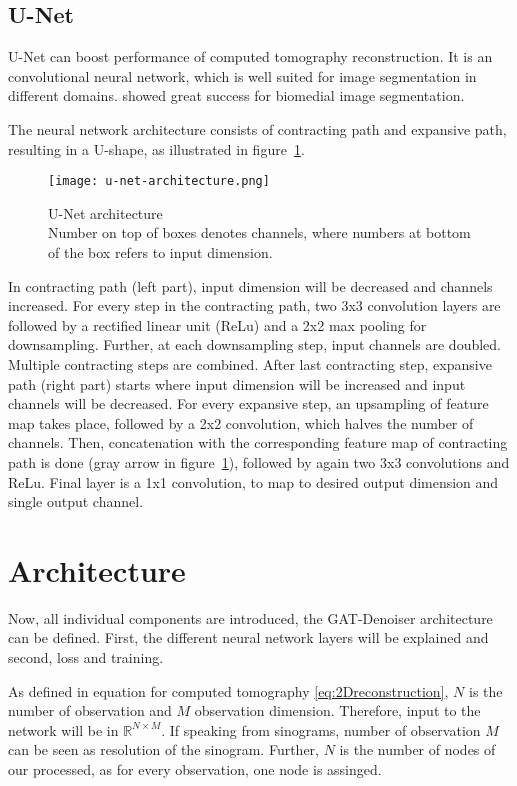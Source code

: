 \subsection{U-Net}
U-Net can boost performance of computed tomography reconstruction.
It is an convolutional neural network, which is well suited for image segmentation in different domains.
\cite{unet-tomography} showed great success for biomedial image segmentation.

The neural network architecture consists of contracting path and expansive path,
resulting in a U-shape, as illustrated in figure~\ref{fig:u-net-architectue}.

\begin{figure}[H]
  \centering
  \label{fig:u-net-architectue}
  \texttt{[image: u-net-architecture.png]}
  \caption{
    U-Net architecture \cite[p 2, Fig. 1]{unet-tomography} \\
    Number on top of boxes denotes channels, where numbers at bottom of the box refers to input dimension.
    }
\end{figure}


In contracting path (left part), input dimension will be decreased and channels increased.
For every step in the contracting path, two 3x3 convolution layers are followed by a rectified linear unit (ReLu)
and a 2x2 max pooling for downsampling. Further, at each downsampling step, input channels are doubled.
Multiple contracting steps are combined. After last contracting step, expansive path (right part) starts
where input dimension will be increased and input channels will be decreased.
For every expansive step, an upsampling of feature map takes place, followed by a 2x2 convolution, 
which halves the number of channels. Then, concatenation with the corresponding feature
map of contracting path is done (gray arrow in figure~\ref{fig:u-net-architectue}), followed by again two 3x3 convolutions and ReLu.
Final layer is a 1x1 convolution, to map to desired output dimension and single output channel.

\section{Architecture}
\label{sec:architecture-GatDenoiser}
Now, all individual components are introduced, the GAT-Denoiser architecture can be defined.
First, the different neural network layers will be explained and second, loss and training.

As defined in equation for computed tomography \ref{eq:2Dreconstruction}, $N$ is the number of observation and
$M$ observation dimension.
Therefore, input to the network will be in $\mathbb{R}^{N \times M}$. If speaking from sinograms, 
number of observation $M$ can be seen as resolution of the sinogram. Further, $N$ is the number
of nodes of our processed, as for every observation, one node is assinged.

